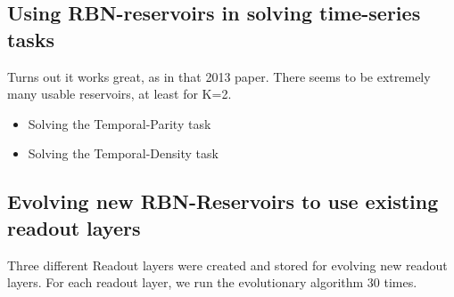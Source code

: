 %      
%      
%      
%      
%
%      
%      
%      
%      

\subsection{Using RBN-reservoirs in solving time-series tasks}

Turns out it works great, as in that 2013 paper.
There seems to be extremely many usable reservoirs, at least for K=2.

\begin{itemize}
  \item Solving the Temporal-Parity task
  \item Solving the Temporal-Density task
\end{itemize}

\subsection{Evolving new RBN-Reservoirs to use existing readout layers}

Three different Readout layers were created and stored for evolving new readout layers.
For each readout layer, we run the evolutionary algorithm 30 times.



